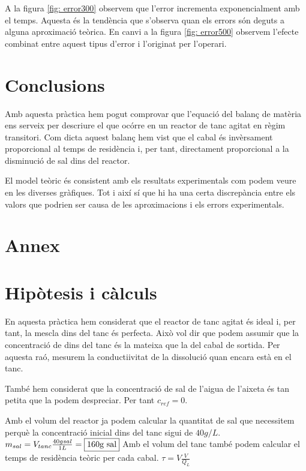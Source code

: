 \documentclass[10pt, twoside]{article}
\begin{document}
A la figura \ref{fig: error300} observem que l'error incrementa exponencialment amb el temps. Aquesta és la tendència que s'observa quan els errors són deguts a alguna aproximació teòrica. En canvi a la figura \ref{fig: error500} observem l'efecte combinat entre aquest tipus d'error i l'originat per l'operari.

\section{Conclusions}
Amb aquesta pràctica hem pogut comprovar que l'equació del balanç de matèria ens serveix per descriure el que ocórre en un reactor de tanc agitat en règim transitori. Com dicta aquest balanç hem vist que el cabal és invèrsament proporcional al temps de residència i, per tant, directament proporcional a la disminució de sal dins del reactor.

El model teòric és consistent amb els resultats experimentals com podem veure en les diverses gràfiques. Tot i així sí que hi ha una certa discrepància entre els valors que podrien ser causa de les aproximacions i els errors experimentals. 

\pagebreak
\section*{Annex}

\appendix

\section{Hipòtesis i càlculs}

En aquesta pràctica hem considerat que el reactor de tanc agitat és ideal i, per tant, la mescla dins del tanc és perfecta. Això vol dir que podem assumir que la concentració de dins del tanc és la mateixa que la del cabal de sortida. Per aquesta raó, mesurem la conductiivitat de la dissolució quan encara està en el tanc.

També hem considerat que la concentració de sal de l'aigua de l'aixeta és tan petita que la podem despreciar. Per tant $c_{ref} = 0$.

Amb el volum del reactor ja podem calcular la quantitat de sal que necessitem perquè la concentració inicial dins del tanc sigui de $40g/L$. 
    $m_{sal} = V_{tanc}\frac{40g sal}{1L} = \fbox{160g sal}$
Amb el volum del tanc també podem calcular el temps de residència teòric per cada cabal.
    $\tau = V\frac{V}{Q_L}$
\end{document}
